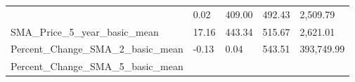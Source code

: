 \documentclass[]{article}
\begin{document}
\begin{longtable}[]{@{}lllll@{}}
\begin{minipage}[t]{0.49\columnwidth}
\end{minipage} & \begin{minipage}[t]{0.08\columnwidth}\raggedright\strut
0.02\strut
\end{minipage} & \begin{minipage}[t]{0.09\columnwidth}\raggedright\strut
409.00\strut
\end{minipage} & \begin{minipage}[t]{0.09\columnwidth}\raggedright\strut
492.43\strut
\end{minipage} & \begin{minipage}[t]{0.11\columnwidth}\raggedright\strut
2,509.79\strut
\end{minipage}\tabularnewline
\begin{minipage}[t]{0.49\columnwidth}\raggedright\strut
SMA\_Price\_5\_year\_basic\_mean\strut
\end{minipage} & \begin{minipage}[t]{0.08\columnwidth}\raggedright\strut
17.16\strut
\end{minipage} & \begin{minipage}[t]{0.09\columnwidth}\raggedright\strut
443.34\strut
\end{minipage} & \begin{minipage}[t]{0.09\columnwidth}\raggedright\strut
515.67\strut
\end{minipage} & \begin{minipage}[t]{0.11\columnwidth}\raggedright\strut
2,621.01\strut
\end{minipage}\tabularnewline
\begin{minipage}[t]{0.49\columnwidth}\raggedright\strut
Percent\_Change\_SMA\_2\_basic\_mean\strut
\end{minipage} & \begin{minipage}[t]{0.08\columnwidth}\raggedright\strut
-0.13\strut
\end{minipage} & \begin{minipage}[t]{0.09\columnwidth}\raggedright\strut
0.04\strut
\end{minipage} & \begin{minipage}[t]{0.09\columnwidth}\raggedright\strut
543.51\strut
\end{minipage} & \begin{minipage}[t]{0.11\columnwidth}\raggedright\strut
393,749.99\strut
\end{minipage}\tabularnewline
\begin{minipage}[t]{0.49\columnwidth}\raggedright\strut
Percent\_Change\_SMA\_5\_basic\_mean\strut

\end{minipage}
\end{longtable}
\end{document}
